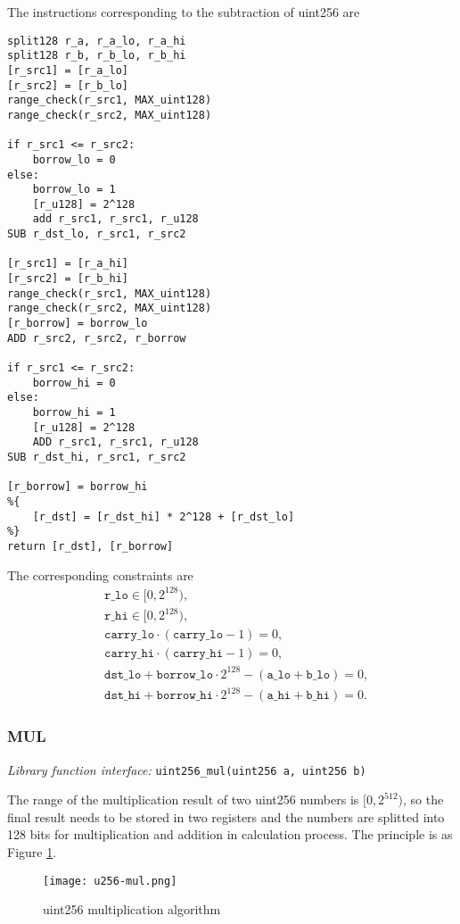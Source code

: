 The instructions corresponding to the subtraction of uint256 are
\begin{lstlisting}[language={}]
split128 r_a, r_a_lo, r_a_hi
split128 r_b, r_b_lo, r_b_hi
[r_src1] = [r_a_lo]
[r_src2] = [r_b_lo]
range_check(r_src1, MAX_uint128)
range_check(r_src2, MAX_uint128)

if r_src1 <= r_src2:
    borrow_lo = 0
else:
    borrow_lo = 1
    [r_u128] = 2^128
    add r_src1, r_src1, r_u128
SUB r_dst_lo, r_src1, r_src2

[r_src1] = [r_a_hi]
[r_src2] = [r_b_hi]
range_check(r_src1, MAX_uint128)
range_check(r_src2, MAX_uint128)
[r_borrow] = borrow_lo
ADD r_src2, r_src2, r_borrow

if r_src1 <= r_src2:
    borrow_hi = 0
else:
    borrow_hi = 1
    [r_u128] = 2^128
    ADD r_src1, r_src1, r_u128
SUB r_dst_hi, r_src1, r_src2

[r_borrow] = borrow_hi
%{
    [r_dst] = [r_dst_hi] * 2^128 + [r_dst_lo]
%}
return [r_dst], [r_borrow]
\end{lstlisting}

The corresponding constraints are
\begin{align*}
    & \texttt{r\_lo} \in [0, 2^{128}), \\
    & \texttt{r\_hi} \in [0, 2^{128}), \\
    & \texttt{carry\_lo} \cdot (\texttt{carry\_lo} - 1) = 0, \\
    & \texttt{carry\_hi} \cdot (\texttt{carry\_hi} - 1) = 0, \\
    & \texttt{dst\_lo} + \texttt{borrow\_lo} \cdot 2^{128} - (\texttt{a\_lo} + \texttt{b\_lo}) = 0, \\
    & \texttt{dst\_hi} + \texttt{borrow\_hi} \cdot 2^{128} - (\texttt{a\_hi} + \texttt{b\_hi}) = 0.
\end{align*}

\subsubsection{MUL}

\emph{Library function interface:} \verb|uint256_mul(uint256 a, uint256 b)|

The range of the multiplication result of two uint256 numbers is $[0,2^{512})$, so the final result needs to be stored in two registers and the numbers are splitted into 128 bits for multiplication and addition in calculation process. The principle is as Figure \ref{fig:u256-mul}.
\begin{figure}[!htp]
    \centering
    \texttt{[image: u256-mul.png]}
    \caption{uint256 multiplication algorithm}
    \label{fig:u256-mul}
\end{figure}

